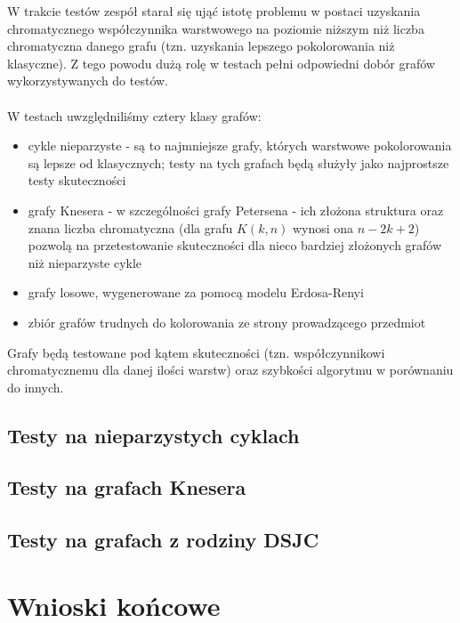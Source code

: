 \documentclass[10pt,a4paper]{article}
\begin{document}
	W trakcie testów zespół starał się ująć istotę problemu w postaci uzyskania chromatycznego współczynnika warstwowego na poziomie niższym niż liczba chromatyczna danego grafu (tzn. uzyskania lepszego pokolorowania niż klasyczne). Z tego powodu dużą rolę w testach pełni odpowiedni dobór grafów wykorzystywanych do testów. 
	\\~\\
	W testach uwzględniliśmy cztery klasy grafów:
	\begin{itemize}
		\item cykle nieparzyste - są to najmniejsze grafy, których warstwowe pokolorowania są lepsze od klasycznych; testy na tych grafach będą służyły jako najprostsze testy skuteczności
		\item grafy Knesera - w szczególności grafy Petersena - ich złożona struktura oraz znana liczba chromatyczna (dla grafu $K(k, n)$ wynosi ona $n - 2k + 2$) pozwolą na przetestowanie skuteczności dla nieco bardziej złożonych grafów niż nieparzyste cykle
		\item grafy losowe, wygenerowane za pomocą modelu Erdosa-Renyi
		\item zbiór grafów trudnych do kolorowania ze strony prowadzącego przedmiot \cite{gci}
	\end{itemize}
	Grafy będą testowane pod kątem skuteczności (tzn. współczynnikowi chromatycznemu dla danej ilości warstw) oraz szybkości algorytmu w porównaniu do innych.
	
	\subsection{Testy na nieparzystych cyklach}
	
	\subsection{Testy na grafach Knesera}
	
	\subsection{Testy na grafach z rodziny DSJC}
	
	
	\section{Wnioski końcowe}
	
	\pagebreak
	
\end{document}
